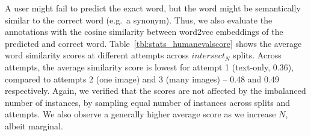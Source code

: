 \documentclass[twocolumn]{svjour3}          \smartqed  \usepackage{graphicx}
\begin{document}
\begin{comment}
\begin{table*}[t]
    \caption{Statistics of human evaluation of the fill-in-the-blank task (guess is correct if raw score $\ge 0.8$). (total counts are slightly higher because strict matching discards e.g. cases with 2 attempts but neither has score of 1)}
    \label{tbl:stats_humanevalinexact}
    \centering
    \begin{tabular}{cccccc}
    \toprule
    & \multicolumn{4}{c}{Correct at attempt} &
    \multirow{2}{*}{Total} \\
    \cline{2-5}
    & 1 & 2 & 3 & Failed & \\
    \midrule
$intersect_0$ & 632 (19.33\%) & 671 (20.53\%) & 501 (15.33\%) & 1465 (44.81\%) & 3269\\
$intersect_1$ & 555 (22.61\%) & 482 (19.63\%) & 384 (15.64\%) & 1034 (42.12\%) & 2455\\
$intersect_2$ & 471 (22.71\%) & 415 (20.01\%) & 301 (14.51\%) & 887 (42.77\%) & 2074\\
$intersect_3$ & 446 (25.23\%) & 395 (22.34\%) & 261 (14.76\%) & 666 (37.67\%) & 1768\\
$intersect_4$ & 411 (25.70\%) & 344 (21.51\%) & 245 (15.32\%) & 599 (37.46\%) & 1599\\
\midrule
& 2515 (22.53\%) & 2307 (20.66\%) & 1692 (15.15\%) & 4651 (41.66\%) & 11165\\
    \bottomrule
    \end{tabular}
\end{table*}
\end{comment}
A user might fail to predict the exact word, but the word might be semantically similar to the correct word (e.g.\ a synonym). Thus, we also evaluate the annotations with the cosine similarity between word2vec embeddings of the predicted and correct word. Table~\ref{tbl:stats_humanevalscore} shows the average word similarity scores at different attempts across $intersect_N$ splits. Across attempts, the average similarity score is lowest for attempt 1 (text-only, 0.36), compared to attempts 2 (one image) and 3 (many images) -- 0.48 and 0.49 respectively. Again, we verified that the scores are not affected by the imbalanced number of instances, by sampling equal number of instances across splits and attempts. We also observe a generally higher average score as we increase $N$, albeit marginal.
\end{document}
